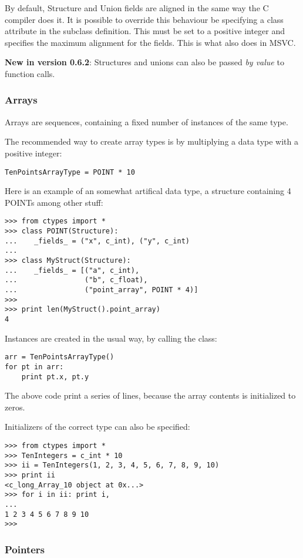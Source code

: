 By default, Structure and Union fields are aligned in the same way the
C compiler does it. It is possible to override this behaviour be
specifying a  class attribute in the subclass
definition. This must be set to a positive integer and specifies the
maximum alignment for the fields. This is what 
also does in MSVC.

\textbf{New in version 0.6.2}: Structures and unions can also be passed \emph{by
value} to function calls.


\subsubsection{Arrays\label{ctypes-arrays}}

Arrays are sequences, containing a fixed number of instances of the
same type.

The recommended way to create array types is by multiplying a data
type with a positive integer:
\begin{verbatim}
TenPointsArrayType = POINT * 10
\end{verbatim}

Here is an example of an somewhat artifical data type, a structure
containing 4 POINTs among other stuff:
\begin{verbatim}
>>> from ctypes import *
>>> class POINT(Structure):
...    _fields_ = ("x", c_int), ("y", c_int)
...
>>> class MyStruct(Structure):
...    _fields_ = [("a", c_int),
...                ("b", c_float),
...                ("point_array", POINT * 4)]
>>>
>>> print len(MyStruct().point_array)
4
\end{verbatim}

Instances are created in the usual way, by calling the class:
\begin{verbatim}
arr = TenPointsArrayType()
for pt in arr:
    print pt.x, pt.y
\end{verbatim}

The above code print a series of  lines, because the array
contents is initialized to zeros.

Initializers of the correct type can also be specified:
\begin{verbatim}
>>> from ctypes import *
>>> TenIntegers = c_int * 10
>>> ii = TenIntegers(1, 2, 3, 4, 5, 6, 7, 8, 9, 10)
>>> print ii
<c_long_Array_10 object at 0x...>
>>> for i in ii: print i,
...
1 2 3 4 5 6 7 8 9 10
>>>
\end{verbatim}


\subsubsection{Pointers\label{ctypes-pointers}}

